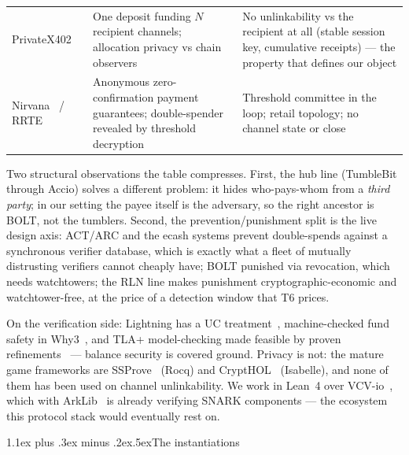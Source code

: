 \documentclass[9pt]{extarticle}
\makeatletter
\renewcommand\section{\@startsection{section}{1}{0pt}%
  {1.1ex plus .3ex minus .2ex}{.5ex}{\normalfont\Large\bfseries}}
\makeatother
\begin{document}
\begin{footnotesize}
\begin{longtable}{>{\raggedright\arraybackslash}p{}>{\raggedright\arraybackslash}p{}>{\raggedright\arraybackslash}p{}}
\addlinespace
PrivateX402~\cite{privatex402} &
One deposit funding $N$ recipient channels; allocation privacy vs chain observers &
No unlinkability vs the recipient at all (stable session key, cumulative receipts) --- the property that defines our object \\
\addlinespace
Nirvana~\cite{nirvana2022} / RRTE~\cite{rrte2023} &
Anonymous zero-confirmation payment guarantees; double-spender revealed by threshold decryption &
Threshold committee in the loop; retail topology; no channel state or close \\
\end{longtable}
\end{footnotesize}

Two structural observations the table compresses. First, the hub line
(TumbleBit through Accio) solves a different problem: it hides
who-pays-whom from a \emph{third party}; in our setting the payee itself
is the adversary, so the right ancestor is BOLT, not the tumblers. Second,
the prevention/punishment split is the live design axis: ACT/ARC and the
ecash systems prevent double-spends against a synchronous verifier
database, which is exactly what a fleet of mutually distrusting verifiers
cannot cheaply have; BOLT punished via revocation, which needs
watchtowers; the RLN line makes punishment cryptographic-economic and
watchtower-free, at the price of a detection window that T6 prices.

On the verification side: Lightning has a UC
treatment~\cite{kiayiaslitos2020}, machine-checked fund safety in
Why3~\cite{why3ln2025}, and TLA+ model-checking made feasible by proven
refinements~\cite{tlaln2025} --- balance security is covered ground.
Privacy is not: the mature game frameworks are SSProve~\cite{ssprove2021}
(Rocq) and CryptHOL~\cite{crypthol2017} (Isabelle), and none of them has
been used on channel unlinkability. We work in Lean~4 over
VCV-io~\cite{vcvio2026}, which with ArkLib~\cite{arklib} is already
verifying SNARK components --- the ecosystem this protocol stack would
eventually rest on.

\section{The instantiations}\label{sec:constructions}
\end{document}

